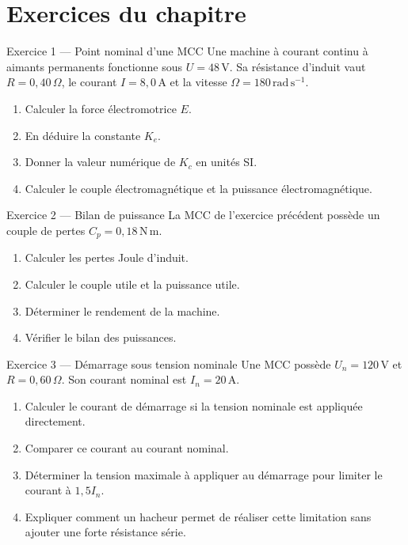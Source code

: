 
\section{Exercices du chapitre}\label{sec:mcc-exercices}

\begin{TLExercise}{Exercice 1 — Point nominal d'une MCC}
Une machine à courant continu à aimants permanents fonctionne sous
$U=48\,\mathrm V$. Sa résistance d'induit vaut $R=0{,}40\,\Omega$, le courant
$I=8{,}0\,\mathrm A$ et la vitesse $\Omega=180\,\mathrm{rad\,s^{-1}}$.
\begin{enumerate}
  \item Calculer la force électromotrice $E$.
  \item En déduire la constante $K_e$.
  \item Donner la valeur numérique de $K_c$ en unités SI.
  \item Calculer le couple électromagnétique et la puissance électromagnétique.
\end{enumerate}
\end{TLExercise}

\begin{TLExercise}{Exercice 2 — Bilan de puissance}
La MCC de l'exercice précédent possède un couple de pertes
$C_p=0{,}18\,\mathrm{N\,m}$.
\begin{enumerate}
  \item Calculer les pertes Joule d'induit.
  \item Calculer le couple utile et la puissance utile.
  \item Déterminer le rendement de la machine.
  \item Vérifier le bilan des puissances.
\end{enumerate}
\end{TLExercise}

\begin{TLExercise}{Exercice 3 — Démarrage sous tension nominale}
Une MCC possède $U_n=120\,\mathrm V$ et $R=0{,}60\,\Omega$.
Son courant nominal est $I_n=20\,\mathrm A$.
\begin{enumerate}
  \item Calculer le courant de démarrage si la tension nominale est appliquée directement.
  \item Comparer ce courant au courant nominal.
  \item Déterminer la tension maximale à appliquer au démarrage pour limiter le courant à $1{,}5I_n$.
  \item Expliquer comment un hacheur permet de réaliser cette limitation sans ajouter une forte résistance série.
\end{enumerate}
\end{TLExercise}

